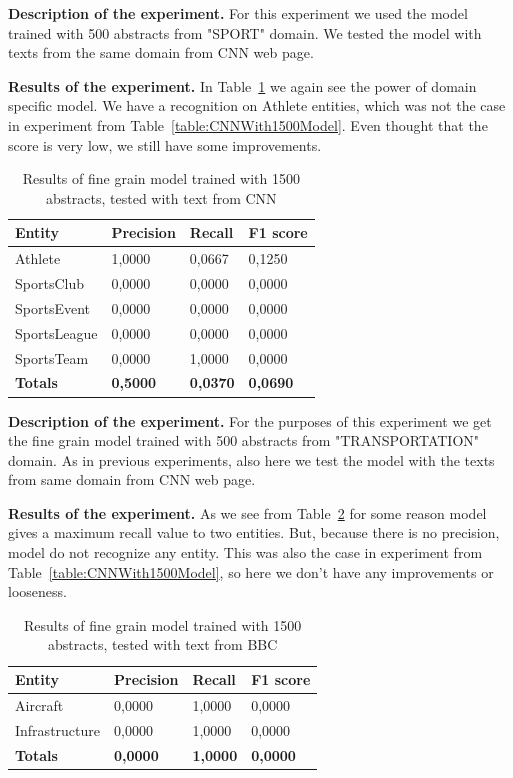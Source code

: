 \documentclass[thesis=M,english]{FITthesis}[2018/05/30]
\begin{document}
\textbf{Description of the experiment.}  For this experiment we used the model trained with 500 abstracts from "SPORT" domain. We tested the model with texts from the same domain from CNN web page.

\textbf{Results of the experiment.} In Table~\ref{table:CNNSportWith500SportModel} we again see the power of domain specific model. We have a recognition on Athlete entities, which was not the case in experiment from Table~\ref{table:CNNWith1500Model}. Even thought that the score is very low, we still have some improvements. 	
	
	\begin{table}[H]\centering
	\begin{tabular}{|l|l|l|l|}
		\hline {\textbf{Entity}} & {\textbf{Precision}} & {\textbf{Recall}} & {\textbf{F1 score}}\\\hline
        Athlete & 1,0000 & 0,0667 & 0,1250\\
		SportsClub & 0,0000 & 0,0000 & 0,0000\\
    	SportsEvent & 0,0000 & 0,0000 & 0,0000\\
   		SportsLeague & 0,0000 & 0,0000 & 0,0000\\
   		SportsTeam & 0,0000 & 1,0000 & 0,0000\\\hline  
		\textbf{Totals} & \textbf{0,5000} & \textbf{0,0370} & \textbf{0,0690}\\\hline
	\end{tabular}			
		\caption{Results of fine grain model trained with 1500 abstracts, tested with text from CNN\label{table:CNNSportWith500SportModel}}
	\end{table}
	

\textbf{Description of the experiment.} For the purposes of this experiment we get the fine grain model trained with 500 abstracts from "TRANSPORTATION" domain. As in previous experiments, also here we test the model with the texts from same domain from CNN web page.

\textbf{Results of the experiment.} As we see from Table~\ref{table:CNNTransportationWith500TransportationModel} for some reason model gives a maximum recall value to two entities. But, because there is no precision, model do not recognize any entity. This was also the case in experiment from Table~\ref{table:CNNWith1500Model}, so here we don't have any improvements or looseness.

	\begin{table}[H]\centering
	\begin{tabular}{|l|l|l|l|}
		\hline {\textbf{Entity}} & {\textbf{Precision}} & {\textbf{Recall}} & {\textbf{F1 score}}\\\hline
        Aircraft & 0,0000 & 1,0000 & 0,0000\\
   		Infrastructure & 0,0000 & 1,0000 & 0,0000\\\hline  
		\textbf{Totals} & \textbf{0,0000} & \textbf{1,0000} & \textbf{0,0000}\\\hline
	\end{tabular}			
		\caption{Results of fine grain model trained with 1500 abstracts, tested with text from BBC\label{table:CNNTransportationWith500TransportationModel}}
	\end{table}	
	
\end{document}
